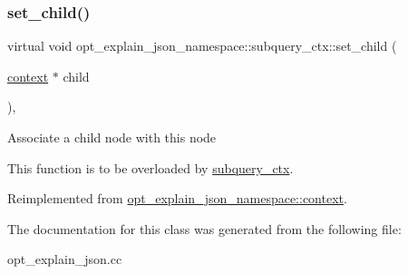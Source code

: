 \subsubsection{\texorpdfstring{set\+\_\+child()}{set\_child()}}
{\footnotesize\ttfamily virtual void opt\+\_\+explain\+\_\+json\+\_\+namespace\+::subquery\+\_\+ctx\+::set\+\_\+child (\begin{DoxyParamCaption}\item[{\mbox{\hyperlink{classopt__explain__json__namespace_1_1context}{context}} $\ast$}]{child }\end{DoxyParamCaption})\hspace{0.3cm}{\ttfamily [inline]}, {\ttfamily [virtual]}}

Associate a child node with this node

This function is to be overloaded by \mbox{\hyperlink{classopt__explain__json__namespace_1_1subquery__ctx}{subquery\+\_\+ctx}}. 

Reimplemented from \mbox{\hyperlink{classopt__explain__json__namespace_1_1context_a16f5a188524441f0bf60b88edc779fa6}{opt\+\_\+explain\+\_\+json\+\_\+namespace\+::context}}.



The documentation for this class was generated from the following file\+:\begin{DoxyCompactItemize}
\item 
opt\+\_\+explain\+\_\+json.\+cc\end{DoxyCompactItemize}
